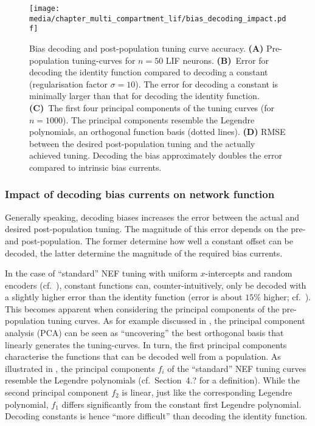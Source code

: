 \begin{figure}
	\texttt{[image: media/chapter\_multi\_compartment\_lif/bias\_decoding\_impact.pdf]}%
	{\label{fig:bias_decoding_impact_a}}%
	{\label{fig:bias_decoding_impact_b}}%
	{\label{fig:bias_decoding_impact_c}}%
	{\label{fig:bias_decoding_impact_d}}%
	\caption[Bias decoding and post-population tuning curve accuracy]{Bias decoding and post-population tuning curve accuracy. \textbf{(A)} Pre-population tuning-curves for $n = 50$ LIF neurons.
	\textbf{(B)}~Error for decoding the identity function compared to decoding a constant (regularisation factor $\sigma = 10$). The error for decoding a constant is minimally larger than that for decoding the identity function.
	\textbf{(C)}~The first four principal components of the tuning curves (for $n = 1000$).
	The principal components resemble the Legendre polynomials, an orthogonal function basis (dotted lines).
	\textbf{(D)} RMSE between the desired post-population tuning and the actually achieved tuning. Decoding the bias approximately doubles the error compared to intrinsic bias currents.}
\end{figure}

\subsubsection{Impact of decoding bias currents on network function}
Generally speaking, decoding biases increases the error between the actual and desired post-population tuning.
The magnitude of this error depends on the pre- and post-population. 
The former determine how well a constant offset can be decoded, the latter determine the magnitude of the required bias currents.

In the case of \enquote{standard} NEF tuning with uniform $x$-intercepts and random encoders (cf.~), constant functions can, counter-intuitively, only be decoded with a slightly higher error than the identity function (error is about $15\%$ higher; cf.~).
This becomes apparent when considering the principal components of the pre-population tuning curves.
As for example discussed in \citet[Chapter~7]{eliasmith2003neural}, the principal component analysis (PCA) can be seen as \enquote{uncovering} the best orthogonal basis that linearly generates the tuning-curves.
In turn, the first principal components characterise the functions that can be decoded well from a population.
As illustrated in , the principal components $f_i$ of the \enquote{standard} NEF tuning curves resemble the Legendre polynomials (cf.~Section~4.? for a definition).
While the second principal component $f_2$ is linear, just like the corresponding Legendre polynomial, $f_1$ differs significantly from the constant first Legendre polynomial.
Decoding constants is hence \enquote{more difficult} than decoding the identity function.

